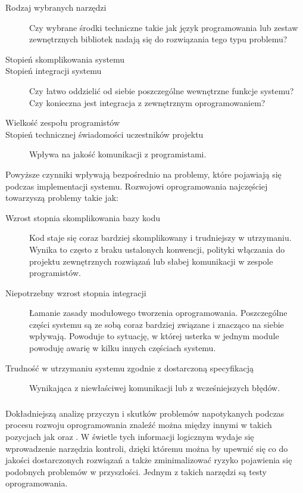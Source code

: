 	  \begin{description}
	    \item[Rodzaj wybranych narzędzi] Czy wybrane środki techniczne takie jak język programowania lub zestaw zewnętrznych bibliotek nadają się do rozwiązania tego typu problemu?
	    \item[Stopień skomplikowania systemu]
	    \item[Stopień integracji systemu] Czy łatwo oddzielić od siebie poszczególne wewnętrzne funkcje systemu? Czy konieczna jest integracja z zewnętrznym oprogramowaniem?
	    \item[Wielkość zespołu programistów]
	    \item[Stopień technicznej świadomości uczestników projektu] Wpływa na jakość komunikacji z programistami.
	  \end{description}
	  
	  Powyższe czynniki wpływają bezpośrednio na problemy, które pojawiają się podczas implementacji systemu. Rozwojowi oprogramowania najczęściej towarzyszą problemy takie jak:
	  
	  \begin{description}
  	  \item[Wzrost stopnia skomplikowania bazy kodu]
  	    Kod staje się coraz bardziej skomplikowany i trudniejszy w utrzymaniu. Wynika to często z braku ustalonych konwencji, polityki włączania do projektu zewnętrznych rozwiązań lub słabej komunikacji w zespole programistów.
  	  \item[Niepotrzebny wzrost stopnia integracji]
  	    Łamanie zasady modułowego tworzenia oprogramowania. Poszczególne części systemu są ze sobą coraz bardziej związane i znacząco na siebie wpływają. Powoduje to sytuację, w której usterka w jednym module powoduję awarię w kilku innych częściach systemu.
  	  \item[Trudność w utrzymaniu systemu zgodnie z dostarczoną specyfikacją]
  	    Wynikająca z niewłaściwej komunikacji lub z wcześniejszych błędów.
  	\end{description}
	
	\subsubsection{}
	Dokładniejszą analizę przyczyn i skutków problemów napotykanych podczas procesu rozwoju oprogramowania znaleźć można między innymi w takich pozycjach jak \cite{pragmatic_programmer} oraz \cite{rspec_book}.  W świetle tych informacji logicznym wydaje się wprowadzenie narzędzia kontroli, dzięki któremu można by upewnić się co do jakości dostarczonych rozwiązań a także zminimalizować ryzyko pojawienia się podobnych problemów w przyszłości. Jednym z takich narzędzi są testy oprogramowania.
	  
